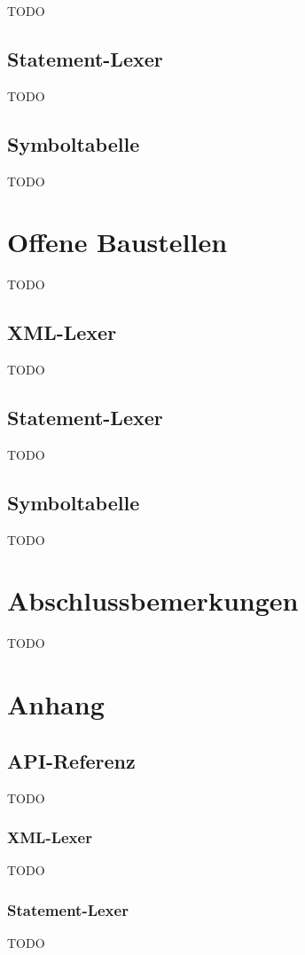 \documentclass[10pt,a4paper,ngerman,titlepage,tocindentauto]{article}
\begin{document}
			TODO
	
		\subsection{Statement-Lexer}
			TODO
	
		\subsection{Symboltabelle}
			TODO
	
	\section{Offene Baustellen}
		TODO
	
		\subsection{XML-Lexer}
			TODO
	
		\subsection{Statement-Lexer}
			TODO
	
		\subsection{Symboltabelle}
			TODO
	
	\section[Abschlussbemerkungen]{\hypertarget{Abschlussbemerkungen}{Abschlussbemerkungen}}
		TODO
	
	\newpage
	\section{Anhang}
		\subsection{API-Referenz}
			TODO
		
			\subsubsection[XML-Lexer]{\hypertarget{XML-Lexer-API}{XML-Lexer}}
				TODO
		
			\subsubsection{Statement-Lexer}
				TODO
		
\end{document}
